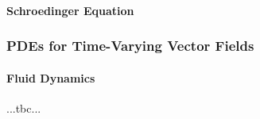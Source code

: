 


\paragraph{Schroedinger Equation} 




% 





\subsubsection{PDEs for Time-Varying Vector Fields}

\paragraph{Fluid Dynamics} ...tbc...

